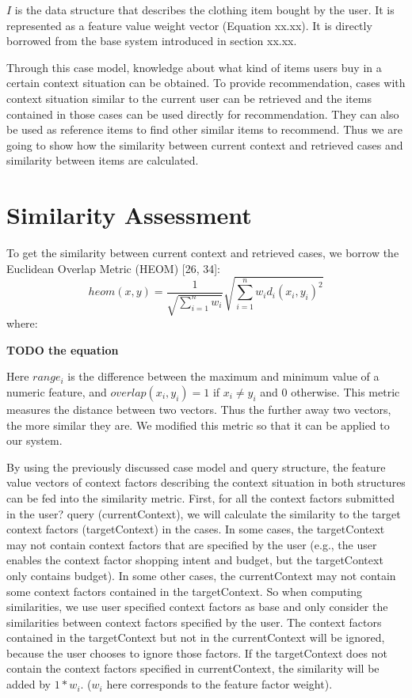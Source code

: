 $I$ is the data structure that describes the clothing item bought by the user. It is represented as a feature value weight vector (Equation xx.xx). It is directly borrowed from the base system introduced in section xx.xx. 

Through this case model, knowledge about what kind of items users buy in a certain context situation can be obtained. To provide recommendation, cases with context situation similar to the current user can be retrieved and the items contained in those cases can be used directly for recommendation. They can also be used as reference items to find other similar items to recommend. Thus we are going to show how the similarity between current context and retrieved cases and similarity between items are calculated.

\section{Similarity Assessment} \label{sec:sa}

To get the similarity between current context and retrieved cases, we borrow the Euclidean Overlap Metric (HEOM) [26, 34]:
\begin{equation} \label{eq:heom}
heom(x,y)=\frac{1}{\sqrt{\sum^n_{i=1}w_i}}\sqrt{\sum^n_{i=1}w_id_i(x_i,y_i)^2}
\end{equation}
where:

\textbf{TODO the equation}

Here $range_i$ is the difference between the maximum and minimum value of a numeric feature, and $overlap(x_i, y_i)=1$ if $x_i \neq y_i$ and 0 otherwise. This metric measures the distance between two vectors. Thus the further away two vectors, the more similar they are. We modified this metric so that it can be applied to our system.

By using the previously discussed case model and query structure, the feature value vectors of context factors describing the context situation in both structures can be fed into the similarity metric. First, for all the context factors submitted in the user? query (currentContext), we will calculate the similarity to the target context factors (targetContext) in the cases. In some cases, the targetContext may not contain context factors that are specified by the user (e.g., the user enables the context factor shopping intent and budget, but the targetContext only contains budget). In some other cases, the currentContext may not contain some context factors contained in the targetContext. So when computing similarities, we use user specified context factors as base and only consider the similarities between context factors specified by the user. The context factors contained in the targetContext but not in the currentContext will be ignored, because the user chooses to ignore those factors. If the targetContext does not contain the context factors specified in currentContext, the similarity will be added by $1* w_i$. ($w_i$ here corresponds to the feature factor weight).

